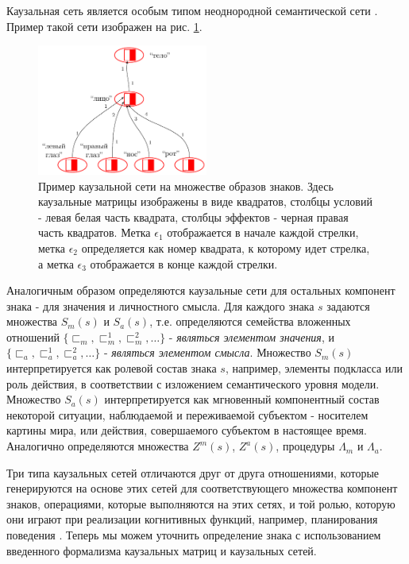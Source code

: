 \documentclass[12pt]{scrartcl}
\begin{document}
	Каузальная сеть является особым типом неоднородной семантической сети \cite{Osipov1990}. Пример такой сети изображен на рис. \ref{fig:caus_net}.

	\begin{figure}[h]
		\centering
		\includegraphics[width=0.5\textwidth,page=1]{examples/causnet/caus_net_colored}
		\caption{Пример каузальной сети на множестве образов знаков. Здесь каузальные матрицы изображены в виде квадратов, столбцы условий - левая белая часть квадрата, столбцы эффектов - черная правая часть квадратов. Метка $\epsilon_1$ отображается в начале каждой стрелки, метка $\epsilon_2$ определяется как номер квадрата, к которому идет стрелка, а метка $\epsilon_3$ отображается в конце каждой стрелки.}
		\label{fig:caus_net}		
	\end{figure}
		
	Аналогичным образом определяются каузальные сети для остальных компонент знака - для значения и личностного смысла. Для каждого знака $s$ задаются множества $S_m(s)$ и $S_a(s)$, т.е. определяются семейства вложенных отношений $\{\sqsubset_m,\sqsubset_m^1,\sqsubset_m^2,\dots\}$ - \textit{являться элементом значения}, и $\{\sqsubset_a,\sqsubset_a^1,\sqsubset_a^2,\dots\}$ - \textit{являться элементом смысла}. Множество $S_m(s)$ интерпретируется как ролевой состав знака $s$, например, элементы подкласса или роль действия, в соответствии с изложением семантического уровня модели. Множество $S_a(s)$ интерпретируется как мгновенный компонентный состав некоторой ситуации, наблюдаемой и переживаемой субъектом - носителем картины мира, или действия, совершаемого субъектом в настоящее время. Аналогично определяются множества $Z^m(s)$, $Z^a(s)$, процедуры $\Lambda_m$ и $\Lambda_a$.
	
	Три типа каузальных сетей отличаются друг от друга отношениями, которые генерируются на основе этих сетей для соответствующего множества компонент знаков, операциями, которые выполняются на этих сетях, и той ролью, которую они играют при реализации когнитивных функций, например, планирования поведения \cite{Osipov2015d,Panov2017a}. Теперь мы можем уточнить определение знака \cite{Osipov2015c} с использованием введенного формализма каузальных матриц и каузальных сетей.
	
\end{document}
